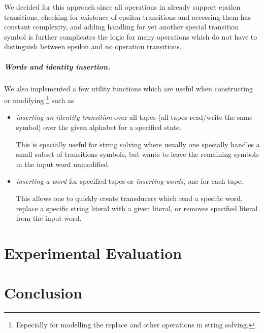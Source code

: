 We decided for this approach since all operations in \mata already support epsilon transitions, checking for existence of epsilon transitions and accessing them has constant complexity, and adding handling for yet another special transition symbol is further complicates the logic for many operations which do not have to distinguish between epsilon and no operation transitions.

\paragraph{Words and identity insertion.}
We also implemented a few utility functions which are useful when constructing or modifying \nfts\footnote{Especially for modelling the replace and other operations in string solving.} such as
\begin{itemize}
  \item \emph{inserting an identity transition} over all tapes (all tapes read/write the same symbol) over the given alphabet for a specified state.

  This is specially useful for string solving where usually one specially handles a small subset of transitions symbols, but wants to leave the remaining symbols in the input word unmodified.

  \item \emph{inserting a word} for specified tapes or \emph{inserting words}, one for each tape.

  This allows one to quickly create transducers which read a specific word, replace a specific string literal with a given literal, or removes specified literal from the input word.
\end{itemize}


\chapter{Experimental Evaluation}

\chapter{Conclusion}


% 
